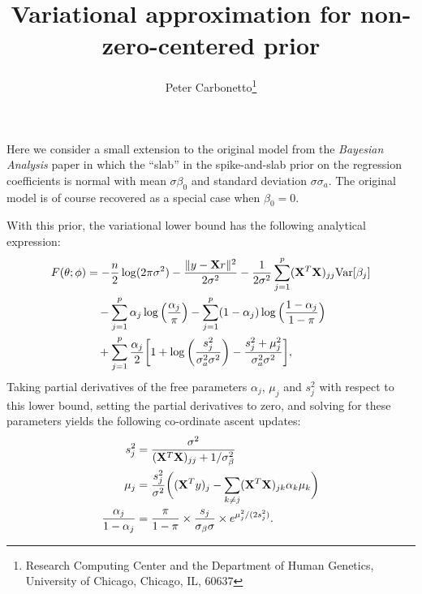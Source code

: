 \documentclass[final]{siamltex}
\title{Variational approximation for non-zero-centered prior}
\author{Peter Carbonetto\thanks{Research Computing Center and the
    Department of Human Genetics, University of Chicago, Chicago, IL,
    60637}}
\begin{document}
\maketitle

\noindent Here we consider a small extension to the original model
from the {\em Bayesian Analysis} paper in which the ``slab'' in the
spike-and-slab prior on the regression coefficients is normal with
mean $\sigma \beta_0$ and standard deviation $\sigma \sigma_a$. The
original model is of course recovered as a special case when $\beta_0
= 0$.

With this prior, the variational lower bound has the following
analytical expression:
\begin{align}
F(\theta; \phi) &=
 - \frac{n}{2}\log(2\pi\sigma^2)
- \frac{\|y - {\bf X}r\|^2}{2\sigma^2} 
- \frac{1}{2\sigma^2} \sum_{j=1}^p ({\bf X}^T{\bf X})_{jj}
  \mathrm{Var}[\beta_j]
  \nonumber \\
&\quad - \sum_{j=1}^p \alpha_j \log\Big(\frac{\alpha_j}{\pi}\Big)
       - \sum_{j=1}^p (1-\alpha_j) \log\Big(\frac{1-\alpha_j}{1-\pi}\Big)
  \nonumber \\
&\quad + \sum_{j=1}^p \frac{\alpha_j}{2} \bigg[
1 + \log\bigg(\frac{s_j^2}{\sigma_a^2 \sigma^2}\bigg)
  - \frac{s_j^2 + \mu_j^2}{\sigma_a^2 \sigma^2} \bigg],
\end{align}
Taking partial derivatives of the free parameters $\alpha_j$, $\mu_j$
and $s_j^2$ with respect to this lower bound, setting the partial
derivatives to zero, and solving for these parameters yields the
following co-ordinate ascent updates:
\begin{align}
s_j^2 &= \frac{\sigma^2}{({\bf X}^T{\bf X})_{jj} + 1/\sigma_{\beta}^2} \\
\mu_j &= \frac{s_j^2}{\sigma^2} \bigg( ({\bf X}^Ty)_j - \sum_{k \neq j} 
({\bf X}^T{\bf X})_{jk} \alpha_k \mu_k \bigg) \\
\frac{\alpha_j}{1-\alpha_j} &= \frac{\pi}{1-\pi} \times 
  \frac{s_j}{\sigma_{\beta}\sigma} \times e^{\mu_j^2/(2s_j^2)}.
\end{align}
\end{document}
